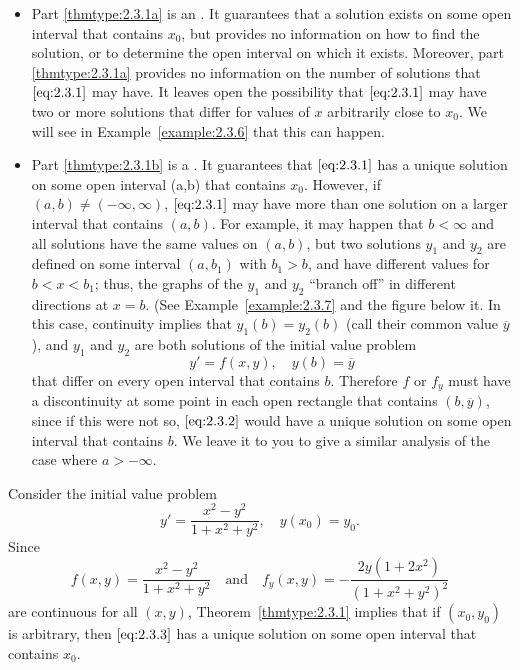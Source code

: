 \documentclass{ximera}
\begin{document}
\begin{itemize}
\item
Part \ref{thmtype:2.3.1a} is an . It guarantees that a
solution exists on some open interval that contains $x_0$, but provides
no information on how to find the solution, or to determine the open
interval on which it exists. Moreover, part \ref{thmtype:2.3.1a} provides no
information on the number of solutions that $\eqref{eq:2.3.1}$ may have. It
leaves open the possibility that $\eqref{eq:2.3.1}$ may have two or more
solutions that differ for values of $x$ arbitrarily close to $x_0$. We
will see in Example~\ref{example:2.3.6} that this can happen.
\item
Part \ref{thmtype:2.3.1b} is a . It guarantees that
$\eqref{eq:2.3.1}$ has a unique solution on some open interval (a,b) that
contains $x_0$. However, if $(a,b)\neq(-\infty,\infty)$,
$\eqref{eq:2.3.1}$ may have more than one solution on a larger interval
that contains $(a,b)$. For example, it may happen that $b<\infty$ and all
solutions have the same values on $(a,b)$, but two solutions $y_1$ and
$y_2$ are defined on some interval $(a,b_1)$ with $b_1>b$, and have
different values for $b<x<b_1$;   thus, the graphs of the $y_1$ and
$y_2$ ``branch off'' in different directions at $x=b$. (See
Example~\ref{example:2.3.7} and %
the figure below it.  In this case,
continuity implies that $y_1(b)=y_2(b)$ (call their common value
$\overline y$), and  $y_1$ and $y_2$ are both solutions of the initial
value problem
\begin{equation} \label{eq:2.3.2}
y'=f(x,y),\quad y(b)=\overline y
\end{equation}
that differ on every open interval that contains $b$. Therefore
$f$ or $f_y$ must have a discontinuity at some point in each open
rectangle that contains $(b,\overline y)$, since if this were not so,
$\eqref{eq:2.3.2}$ would have a unique solution on some open interval
that contains $b$. We leave it to you to give a similar analysis of the
case where $a>-\infty$.
 \end{itemize}

\begin{example}\label{example:2.3.1}
Consider the initial value problem
\begin{equation} \label{eq:2.3.3}
y'=\frac{x^2-y^2}{1+x^2+y^2}, \quad y(x_0)=y_0.
\end{equation}
Since
$$
f(x,y)  = \frac{x^2-y^2}{1+x^2+y^2} \quad\mbox{and}\quad 
f_y(x,y)  =  -\frac{2y(1+2x^2)}{(1+x^2+y^2)^2}
$$
are continuous for all $(x,y)$, Theorem~\ref{thmtype:2.3.1} implies that
if $(x_0,y_0)$ is arbitrary, then
$\eqref{eq:2.3.3}$ has a unique solution on some open interval that contains
$x_0$.
\end{example}
\end{document}
